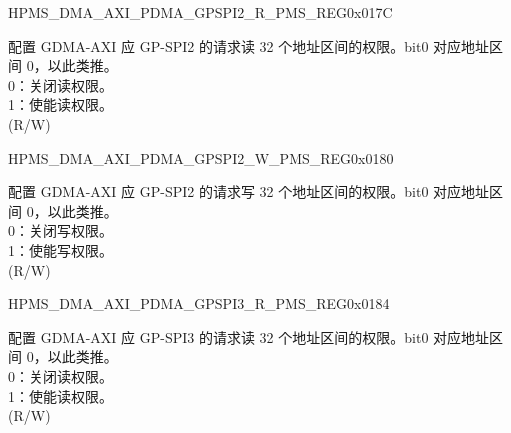 \begin{register}{H}{PMS\_DMA\_AXI\_PDMA\_GPSPI2\_R\_PMS\_REG}{0x017C}\label{regdesc:PMSDMAAXIPDMAGPSPI2RPMSREG}
%
\regnewline%
\begin{regdesc}\begin{reglist}
\label{fielddesc:PMSDMAAXIPDMAGPSPI2RPMS}\item [PMS\_DMA\_AXI\_PDMA\_GPSPI2\_R\_PMS] 配置 GDMA-AXI 应 GP-SPI2 的请求读 32 个地址区间的权限。bit0 对应地址区间 0，以此类推。\\
0：关闭读权限。\\
1：使能读权限。\\ (R/W)
\end{reglist}\end{regdesc}
\end{register}


\begin{register}{H}{PMS\_DMA\_AXI\_PDMA\_GPSPI2\_W\_PMS\_REG}{0x0180}\label{regdesc:PMSDMAAXIPDMAGPSPI2WPMSREG}
%
\regnewline%
\begin{regdesc}\begin{reglist}
\label{fielddesc:PMSDMAAXIPDMAGPSPI2WPMS}\item [PMS\_DMA\_AXI\_PDMA\_GPSPI2\_W\_PMS] 配置 GDMA-AXI 应 GP-SPI2 的请求写 32 个地址区间的权限。bit0 对应地址区间 0，以此类推。\\
0：关闭写权限。\\
1：使能写权限。\\ (R/W)
\end{reglist}\end{regdesc}
\end{register}


\begin{register}{H}{PMS\_DMA\_AXI\_PDMA\_GPSPI3\_R\_PMS\_REG}{0x0184}\label{regdesc:PMSDMAAXIPDMAGPSPI3RPMSREG}
%
\regnewline%
\begin{regdesc}\begin{reglist}
\label{fielddesc:PMSDMAAXIPDMAGPSPI3RPMS}\item [PMS\_DMA\_AXI\_PDMA\_GPSPI3\_R\_PMS] 配置 GDMA-AXI 应 GP-SPI3 的请求读 32 个地址区间的权限。bit0 对应地址区间 0，以此类推。\\
0：关闭读权限。\\
1：使能读权限。\\ (R/W)
\end{reglist}\end{regdesc}
\end{register}


